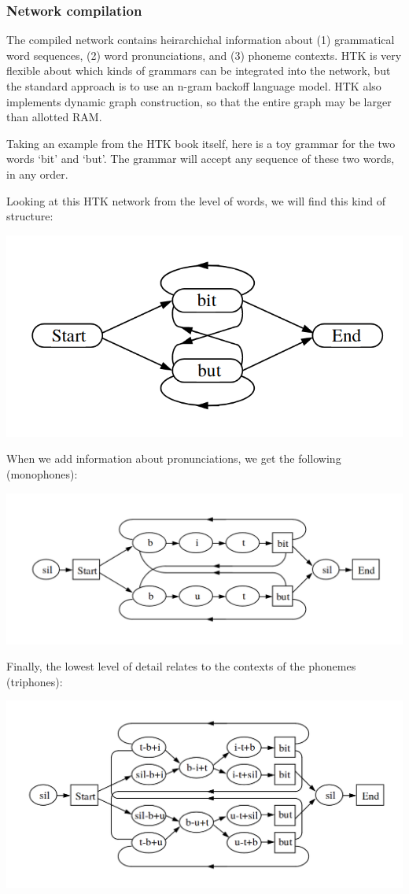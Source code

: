 \documentclass[10pt,a4paper]{article}
\begin{document}
\subsubsection*{Network compilation}

The compiled network contains heirarchichal information about (1) grammatical word sequences, (2) word pronunciations, and (3) phoneme contexts. HTK is very flexible about which kinds of grammars can be integrated into the network, but the standard approach is to use an n-gram backoff language model. HTK also implements dynamic graph construction, so that the entire graph may be larger than allotted RAM.

Taking an example from the HTK book itself, here is a toy grammar for the two words `bit' and `but'. The grammar will accept any sequence of these two words, in any order.

Looking at this HTK network from the level of words, we will find this kind of structure:

\begin{center}
  \includegraphics[width=.5\textwidth,keepaspectratio]{figs/htk-graph-word.png}
\end{center}

When we add information about pronunciations, we get the following (monophones):

\begin{center}
  \includegraphics[width=.7\textwidth,keepaspectratio]{figs/htk-graph-mono.png}
\end{center}

Finally, the lowest level of detail relates to the contexts of the phonemes (triphones):

\begin{center}
  \includegraphics[width=.7\textwidth,keepaspectratio]{figs/htk-graph-tri.png}
\end{center}
\end{document}
